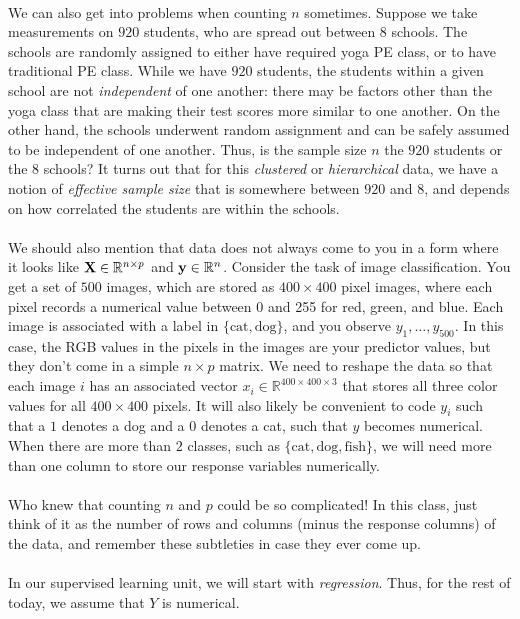 \\
We can also get into problems when counting $n$ sometimes. Suppose we take measurements on $920$ students, who are spread out between $8$ schools. The schools are randomly assigned to either have required yoga PE class, or to have traditional PE class.  While we have $920$ students, the students within a given school are not \emph{independent} of one another: there may be factors other than the yoga class that are making their test scores more similar to one another. On the other hand, the schools underwent random assignment and can be safely assumed to be independent of one another. Thus, is the sample size $n$ the $920$ students or the $8$ schools? It turns out that for this \emph{clustered} or \emph{hierarchical} data, we have a notion of \emph{effective sample size} that is somewhere between $920$ and $8$, and depends on how correlated the students are within the schools. \\
\\
We should also mention that data does not always come to you in a form where it looks like $\bold{X} \in \mathbb{R}^{n \times p}$ and $\bold{y} \in \mathbb{R}^n$. Consider the task of image classification. You get a set of $500$ images, which are stored as $400 \times 400$ pixel images, where each pixel records a numerical value between 0 and 255 for red, green, and blue. Each image is associated with a label in $\{\text{cat},  \text{dog}\}$, and you observe $y_1,\ldots, y_{500}$. In this case, the RGB values in the pixels in the images are your predictor values, but they don't come in a simple $n \times p$ matrix. We need to reshape the data so that each image $i$ has an associated vector $x_i \in \mathbb{R}^{400 \times 400 \times 3}$ that stores all three color values for all $400 \times 400$ pixels. It will also likely be convenient to code $y_i$ such that a $1$ denotes a dog and a $0$ denotes a cat, such that $y$ becomes numerical. When there are more than $2$ classes, such as $\{\text{cat},  \text{dog}, \text{fish}\}$, we will need more than one column to store our response variables numerically.  \\ 
\\
Who knew that counting $n$ and $p$ could be so complicated! In this class, just think of it as the number of rows and columns (minus the response columns) of the data, and remember these subtleties in case they ever come up. \\
\\
In our supervised learning unit, we will start with \emph{regression}. Thus, for the rest of today, we assume that $Y$ is numerical. 


